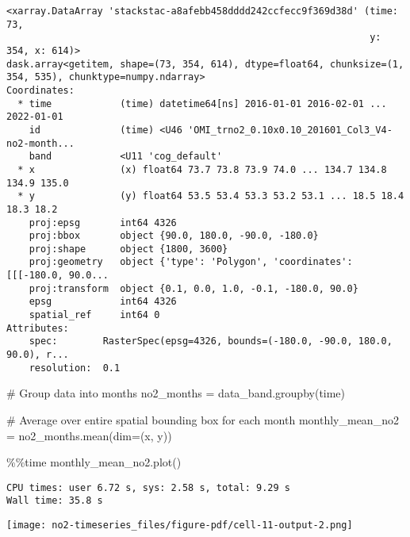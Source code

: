 \documentclass[
  letterpaper,
  DIV=11,
  numbers=noendperiod]{scrreprt}
\newenvironment{Shaded}{\begin{snugshade}}{\end{snugshade}}
\newcommand{\CommentTok}[1]{\textcolor[rgb]{0.37,0.37,0.37}{#1}}
\newcommand{\NormalTok}[1]{\textcolor[rgb]{0.00,0.46,0.62}{#1}}
\newcommand{\OperatorTok}[1]{\textcolor[rgb]{0.37,0.37,0.37}{#1}}
\newcommand{\StringTok}[1]{\textcolor[rgb]{0.13,0.47,0.30}{#1}}
\begin{document}
\begin{verbatim}
<xarray.DataArray 'stackstac-a8afebb458dddd242ccfecc9f369d38d' (time: 73,
                                                                y: 354, x: 614)>
dask.array<getitem, shape=(73, 354, 614), dtype=float64, chunksize=(1, 354, 535), chunktype=numpy.ndarray>
Coordinates:
  * time            (time) datetime64[ns] 2016-01-01 2016-02-01 ... 2022-01-01
    id              (time) <U46 'OMI_trno2_0.10x0.10_201601_Col3_V4-no2-month...
    band            <U11 'cog_default'
  * x               (x) float64 73.7 73.8 73.9 74.0 ... 134.7 134.8 134.9 135.0
  * y               (y) float64 53.5 53.4 53.3 53.2 53.1 ... 18.5 18.4 18.3 18.2
    proj:epsg       int64 4326
    proj:bbox       object {90.0, 180.0, -90.0, -180.0}
    proj:shape      object {1800, 3600}
    proj:geometry   object {'type': 'Polygon', 'coordinates': [[[-180.0, 90.0...
    proj:transform  object {0.1, 0.0, 1.0, -0.1, -180.0, 90.0}
    epsg            int64 4326
    spatial_ref     int64 0
Attributes:
    spec:        RasterSpec(epsg=4326, bounds=(-180.0, -90.0, 180.0, 90.0), r...
    resolution:  0.1
\end{verbatim}

\begin{Shaded}
\begin{Highlighting}[]
\CommentTok{\# Group data into months}
\NormalTok{no2\_months }\OperatorTok{=}\NormalTok{ data\_band.groupby(}\StringTok{\textquotesingle{}time\textquotesingle{}}\NormalTok{)}
\end{Highlighting}
\end{Shaded}

\begin{Shaded}
\begin{Highlighting}[]
\CommentTok{\# Average over entire spatial bounding box for each month}
\NormalTok{monthly\_mean\_no2 }\OperatorTok{=}\NormalTok{ no2\_months.mean(dim}\OperatorTok{=}\NormalTok{(}\StringTok{\textquotesingle{}x\textquotesingle{}}\NormalTok{, }\StringTok{\textquotesingle{}y\textquotesingle{}}\NormalTok{))}
\end{Highlighting}
\end{Shaded}

\begin{Shaded}
\begin{Highlighting}[]
\OperatorTok{\%\%}\NormalTok{time}
\NormalTok{monthly\_mean\_no2.plot()}
\end{Highlighting}
\end{Shaded}

\begin{verbatim}
CPU times: user 6.72 s, sys: 2.58 s, total: 9.29 s
Wall time: 35.8 s
\end{verbatim}

\texttt{[image: no2-timeseries\_files/figure-pdf/cell-11-output-2.png]}
\end{document}
